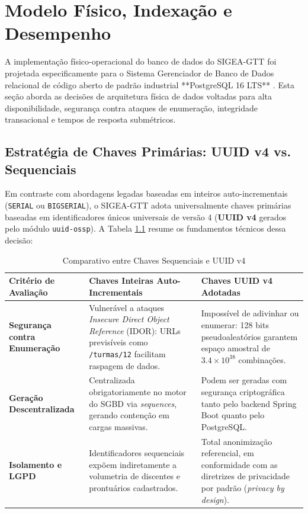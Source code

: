 \chapter{Modelo Físico, Indexação e Desempenho}
\label{cap_modelo_fisico}

A implementação físico-operacional do banco de dados do SIGEA-GTT foi projetada especificamente para o Sistema Gerenciador de Banco de Dados relacional de código aberto de padrão industrial **PostgreSQL 16 LTS** \cite{postgresql2024}. Esta seção aborda as decisões de arquitetura física de dados voltadas para alta disponibilidade, segurança contra ataques de enumeração, integridade transacional e tempos de resposta submétricos.

\section{Estratégia de Chaves Primárias: UUID v4 vs. Sequenciais}
\label{sec_uuid_vs_seq}

Em contraste com abordagens legadas baseadas em inteiros auto-incrementais (\texttt{SERIAL} ou \texttt{BIGSERIAL}), o SIGEA-GTT adota universalmente chaves primárias baseadas em identificadores únicos universais de versão 4 (\textbf{UUID v4} gerados pelo módulo \texttt{uuid-ossp}). A Tabela \ref{tab_comparativo_chaves} resume os fundamentos técnicos dessa decisão:

\begin{table}[!ht]
\centering
\caption{Comparativo entre Chaves Sequenciais e UUID v4}
\label{tab_comparativo_chaves}
\small
\begin{tabularx}{\textwidth}{p{3.2cm}X X}
\toprule
\textbf{Critério de Avaliação} & \textbf{Chaves Inteiras Auto-Incrementais} & \textbf{Chaves UUID v4 Adotadas} \\
\midrule
\textbf{Segurança contra Enumeração} & Vulnerável a ataques \textit{Insecure Direct Object Reference} (IDOR): URLs previsíveis como \texttt{/turmas/12} facilitam raspagem de dados. & Impossível de adivinhar ou enumerar: 128 bits pseudoaleatórios garantem espaço amostral de $3.4 \times 10^{38}$ combinações. \\
\addlinespace
\textbf{Geração Descentralizada} & Centralizada obrigatoriamente no motor do SGBD via \textit{sequences}, gerando contenção em cargas massivas. & Podem ser geradas com segurança criptográfica tanto pelo backend Spring Boot quanto pelo PostgreSQL. \\
\addlinespace
\textbf{Isolamento e LGPD} & Identificadores sequenciais expõem indiretamente a volumetria de discentes e prontuários cadastrados. & Total anonimização referencial, em conformidade com as diretrizes de privacidade por padrão (\textit{privacy by design}). \\
\bottomrule
\end{tabularx}
\end{table}

